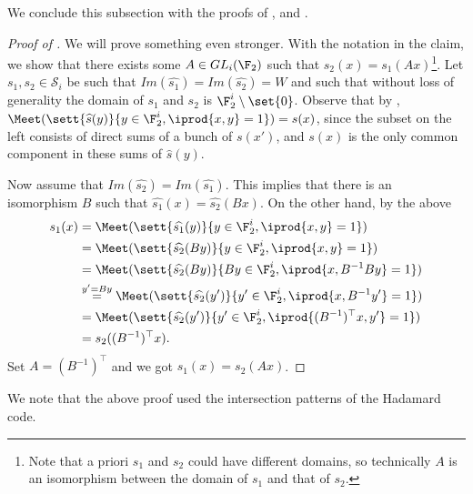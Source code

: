 We conclude this subsection with the proofs of ,  and .
\begin{proof}[Proof of ]
    We will prove something even stronger. With the notation in the claim, we show that there exists some \(A \in GL_{i}(\F_2)\) such that \(s_2(x) = s_1(Ax)\)\footnote{Note that a priori \(s_1\) and \(s_2\) could have different domains, so technically \(A\) is an isomorphism between the domain of \(s_1\) and that of \(s_2\).}. Let \(s_1,s_2 \in \mathcal{S}_i\) be such that \(Im(\widehat{s_1})=Im(\widehat{s_2})=W\) and such that without loss of generality the domain of \(s_1\) and \(s_2\) is \(\F_2^i \setminus \set{0}\). Observe that by , \( \Meet(\sett{\widehat{s}(y)}{y \in \F_2^i, \iprod{x,y}=1}) = s(x) \), since the subset on the left consists of direct sums of a bunch of \(s(x')\), and \(s(x)\) is the only common component in these sums of \(\widehat{s}(y)\).

    Now assume that \(Im(\widehat{s_2}) = Im(\widehat{s_1})\). This implies that there is an isomorphism \(B\) such that \(\widehat{s_1}(x)=\widehat{s_2}(Bx)\). On the other hand, by the above
    \begin{align*}
        s_1(x) &= \Meet(\sett{\widehat{s_1}(y)}{y \in \F_2^i, \iprod{x,y}=1})\\
        &=\Meet(\sett{\widehat{s_2}(By)}{y \in \F_2^i, \iprod{x,y}=1})\\
        &=\Meet(\sett{\widehat{s_2}(By)}{By \in \F_2^i, \iprod{x,B^{-1} By}=1})\\
        &\overset{y'=By}{=}\Meet(\sett{\widehat{s_2}(y')}{y' \in \F_2^i, \iprod{x,B^{-1} y'}=1})\\
        &=\Meet(\sett{\widehat{s_2}(y')}{y' \in \F_2^i, \iprod{(B^{-1})^\top x,y'}=1})\\
        &= s_2((B^{-1})^\top x).
    \end{align*}
    Set \(A = (B^{-1})^\top\) and we got \(s_1(x)=s_2(Ax)\).
\end{proof}
We note that the above proof used the intersection patterns of the Hadamard code.

